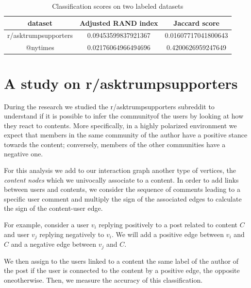 \begin{table}
	\centering
	\caption{Classification scores on two labeled datasets}
	\label{tab:scores-datasets-labeled}
	\begin{tabular}{c|c|c}
		dataset                     & Adjusted RAND index       & Jaccard score             \\
		\hline r/asktrumpsupporters & \num{0.09453599837921367} & \num{0.01607717041800643} \\
		@nytimes                    & \num{0.02176064966494696} & \num{0.4200626959247649}  \\
	\end{tabular}
\end{table}


\section{A study on r/asktrumpsupporters}%
\label{sec:the_r_asktrumpsupporters_case}

During the research we studied the r/asktrumpsupporters subreddit to
understand if it is possible to infer the community\footnotemark of the users by
looking at how they react to contents. More specifically, in a highly polarized
environment we expect that members in the same community of the
author have a positive stance towards the content; conversely, members of the
other communities have a negative one.


\bigskip

For this analysis we add to our interaction graph another type of vertices, the
\emph{content nodes} which we univocally associate to a content. In order to
add links between users and contents, we consider the sequence of comments
leading to a specific user comment and multiply the sign of the
associated edges to calculate the sign of the content-user edge.

For example, consider a user $v_i$
replying positively to a post related to content $C$ and user $v_j$ replying
negatively to $v_i$. We will add a positive edge between $v_i$ and $C$ and a
negative edge between $v_j$ and $C$.

We then assign to the users linked to a content the same label of the author of
the post if the user is connected to the content
by a positive edge, the opposite one\footnotemark otherwise. Then, we measure the accuracy of
this classification.

